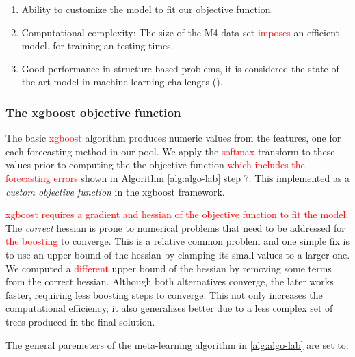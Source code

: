 \documentclass[11pt,a4paper,]{article}
\providecommand{\tightlist}{%
  \setlength{\itemsep}{0pt}\setlength{\parskip}{0pt}}
\theoremstyle{definition}
\theoremstyle{definition}
\theoremstyle{definition}
\theoremstyle{remark}
\begin{document}
\begin{enumerate}
\def\labelenumi{\arabic{enumi}.}
\tightlist
\item
  Ability to customize the model to fit our objective function.
\item
  Computational complexity: The size of the M4 data set
  \textcolor{red}{imposes} an efficient model, for training an testing
  times.
\item
  Good performance in structure based problems, it is considered the
  state of the art model in machine learning challenges
  (\textcite{chen2016xgboost}).
\end{enumerate}

\subsubsection{The xgboost objective
function}\label{the-xgboost-objective-function}

The basic \textcolor{red}{xgboost} algorithm produces numeric values
from the features, one for each forecasting method in our pool. We apply
the \textcolor{red}{softmax} transform to these values prior to
computing the the objective function
\textcolor{red}{which includes the forecasting errors} shown in
Algorithm \ref{alg:algo-lab} step 7. This implemented as a \emph{custom
objective function} in the xgboost framework.

\textcolor{red}{xgboost requires a gradient and hessian of the objective function to fit the model.}
The \emph{correct} hessian is prone to numerical problems that need to
be addressed for \textcolor{red}{ the boosting} to converge. This is a
relative common problem and one simple fix is to use an upper bound of
the hessian by clamping its small values to a larger one. We computed a
\textcolor{red}{different} upper bound of the hessian by removing some
terms from the correct hessian. Although both alternatives converge, the
later works faster, requiring less boosting steps to converge. This not
only increases the computational efficiency, it also generalizes better
due to a less complex set of trees produced in the final solution.

The general paremeters of the meta-learning algorithm in
\ref{alg:algo-lab} are set to:
\end{document}
